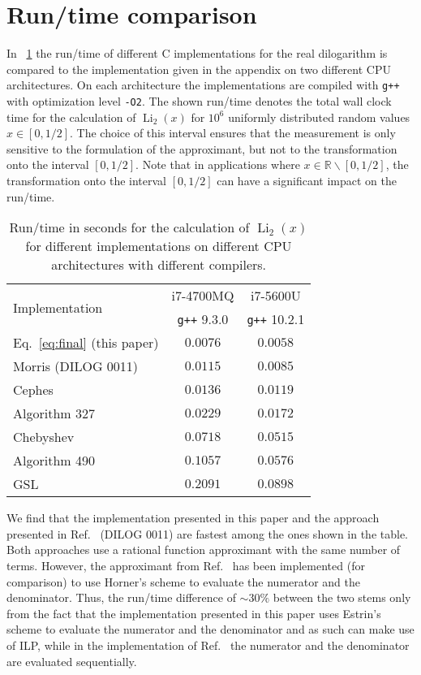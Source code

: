 \documentclass[10pt,DIV16,twocolumn,numbers=noenddot]{scrartcl}
\newcommand{\Li}{\operatorname{Li}_2}
\newcommand{\tabref}[1]{\tablename~\ref{#1}}
\begin{document}
\section{Run\-/time comparison}

In \tabref{tab:runtime} the run\-/time of different C implementations
for the real dilogarithm is compared to the implementation given in
the appendix on two different CPU architectures.  On each architecture
the implementations are compiled with \texttt{g++} with optimization
level \texttt{-O2}.  The shown run\-/time denotes the total wall clock
time for the calculation of $\Li(x)$ for $10^6$ uniformly distributed
random values $x\in[0,1/2]$.  The choice of this interval ensures that
the measurement is only sensitive to the formulation of the
approximant, but not to the transformation onto the interval
$[0,1/2]$.  Note that in applications where
$x\in\mathbb{R}\backslash [0,1/2]$, the transformation onto the
interval $[0,1/2]$ can have a significant impact on the run\-/time.

\begin{table}[tb]
  \centering
  \caption{Run\-/time in seconds for the calculation of $\Li(x)$ for
    different implementations on different CPU architectures with
    different compilers.}
  \begin{tabular}{lcc}
    \toprule
    \multirow{2}{*}{Implementation} & i7-4700MQ & i7-5600U \\
    & \texttt{g++} 9.3.0 & \texttt{g++} 10.2.1 \\
    \midrule
    Eq.~\eqref{eq:final} (this paper) & $0.0076$ & $0.0058$ \\
    Morris (DILOG 0011) \cite{morris} & $0.0115$ & $0.0085$ \\
    Cephes \cite{cephes}              & $0.0136$ & $0.0119$ \\
    Algorithm 327 \cite{koelbigDilog} & $0.0229$ & $0.0172$ \\
    Chebyshev \cite{luke,root}        & $0.0718$ & $0.0515$ \\
    Algorithm 490 \cite{ginsberg}     & $0.1057$ & $0.0576$ \\
    GSL \cite{gsl}                    & $0.2091$ & $0.0898$ \\
    \bottomrule
  \end{tabular}
  \label{tab:runtime}
\end{table}%

We find that the implementation presented in this paper and the
approach presented in Ref.~\cite{morris} (DILOG 0011) are fastest
among the ones shown in the table.  Both approaches use a rational
function approximant with the same number of terms.  However, the
approximant from Ref.~\cite{morris} has been implemented (for
comparison) to use Horner's scheme to evaluate the numerator and the
denominator.  Thus, the run\-/time difference of $\sim 30\%$ between
the two stems only from the fact that the implementation presented in
this paper uses Estrin's scheme to evaluate the numerator and the
denominator and as such can make use of ILP, while in the
implementation of Ref.~\cite{morris} the numerator and the denominator
are evaluated sequentially.
\end{document}

